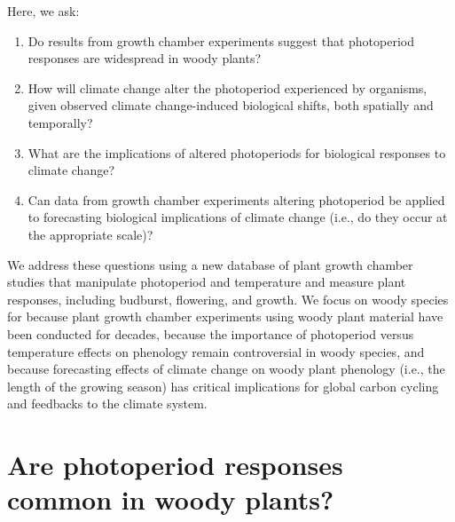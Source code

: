 \documentclass{article}
\begin{document}
\par Here, we ask: 
\begin{enumerate}
\item Do results from growth chamber experiments suggest that photoperiod responses are widespread in woody plants?
\item How will climate change alter the photoperiod experienced by organisms, given observed climate change-induced biological shifts, both spatially and temporally?
\item What are the implications of altered photoperiods for biological responses to climate change?
\item Can data from growth chamber experiments altering photoperiod be applied to forecasting biological implications of climate change (i.e., do they occur at the appropriate scale)?

\end{enumerate}
\par We address these questions using a new database of plant growth chamber studies that manipulate photoperiod and temperature and measure plant responses, including budburst, flowering, and growth. We focus on woody species for because plant growth chamber experiments using woody plant material have been conducted for decades, because the importance of photoperiod versus temperature effects on phenology remain controversial in woody species, and because forecasting effects of climate change on woody plant phenology (i.e., the length of the growing season) has critical implications for global carbon cycling and feedbacks to the climate system. 

\section*{Are photoperiod responses common in woody plants?}
\end{document}
